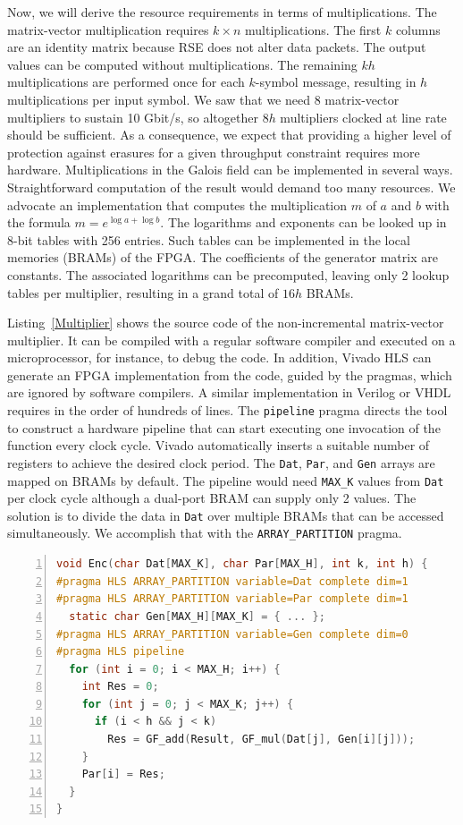 Now, we will derive the resource requirements in terms of multiplications.
The matrix-vector multiplication requires $k \times n$ multiplications.  The
first $k$ columns are an identity matrix because RSE does not alter data
packets.  The output values can be computed without multiplications.  The
remaining $kh$ multiplications are performed once for each $k$-symbol message,
resulting in $h$ multiplications per input symbol.  We saw that we need 8
matrix-vector multipliers to sustain 10 Gbit/s, so altogether $8h$ multipliers
clocked at line rate should be sufficient.  As a consequence, we expect that
providing a higher level of protection against erasures for a given throughput
constraint requires more hardware.  Multiplications in the Galois field can be
implemented in several ways.  Straightforward computation of the result would
demand too many resources.  We advocate an implementation that computes the
multiplication $m$ of $a$ and $b$ with the formula $m = e^{\log a + \log b}$.
The logarithms and exponents can be looked up in 8-bit tables with 256 entries.
Such tables can be implemented in the local memories (BRAMs) of the FPGA.  
The coefficients of the generator matrix are constants.  The associated
logarithms can be precomputed, leaving only 2 lookup tables per multiplier,
resulting in a grand total of $16h$ BRAMs.

Listing~\ref{Multiplier} shows the source code of the non-incremental
matrix-vector multiplier.  It can be compiled with a regular software
compiler and executed on a microprocessor, for instance, to debug the code.
In addition, Vivado HLS can generate an FPGA implementation
from the code, guided by the pragmas, which are ignored by software compilers.
A similar implementation in Verilog or VHDL requires in the order of hundreds
of lines.  The {\tt pipeline} pragma directs the tool to construct a
hardware pipeline that can start executing one invocation of the function
every clock cycle.  Vivado automatically inserts a suitable number of registers
to achieve the desired clock period.
The {\tt Dat}, {\tt Par}, and {\tt Gen} arrays are mapped
on BRAMs by default.  The pipeline would need {\tt MAX\_K} values from {\tt Dat}
per clock cycle although a dual-port BRAM can supply only 2 values.  The
solution is to divide the data in {\tt Dat} over multiple BRAMs that can be
accessed simultaneously.  We accomplish that with the {\tt ARRAY\_PARTITION}
pragma.

\begin{lstlisting}[language=C,basicstyle=\footnotesize,numbers=left,
                   captionpos=b,caption={Matrix-Vector Multiplier},
                   label=Multiplier]
void Enc(char Dat[MAX_K], char Par[MAX_H], int k, int h) {
#pragma HLS ARRAY_PARTITION variable=Dat complete dim=1
#pragma HLS ARRAY_PARTITION variable=Par complete dim=1
  static char Gen[MAX_H][MAX_K] = { ... };
#pragma HLS ARRAY_PARTITION variable=Gen complete dim=0
#pragma HLS pipeline
  for (int i = 0; i < MAX_H; i++) {
    int Res = 0;
    for (int j = 0; j < MAX_K; j++) {
      if (i < h && j < k)
        Res = GF_add(Result, GF_mul(Dat[j], Gen[i][j]));
    }
    Par[i] = Res;
  }
}
\end{lstlisting}

